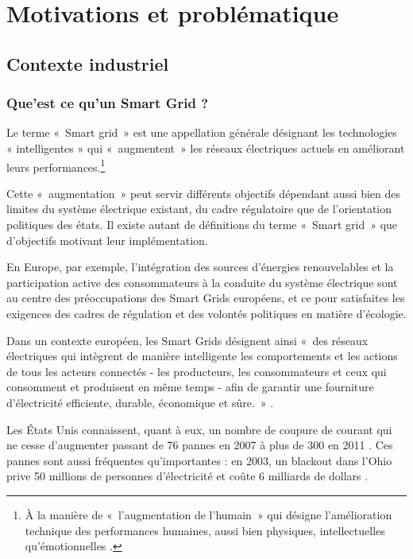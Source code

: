 \chapter{Motivations et problématique}
\label{chap:problematique}

\section{Contexte industriel}

\subsection{Que'est ce qu'un Smart Grid ?}
Le terme «~Smart grid~» est une appellation générale désignant les technologies « intelligentes » qui «~augmentent~» les réseaux électriques actuels en améliorant leurs performances.\footnote{À la manière de «~l'augmentation de l'humain~» qui désigne l'amélioration technique des performances humaines, aussi bien physiques, intellectuelles qu'émotionnelles \cite{le2013humain}.}

Cette «~augmentation~» peut servir différents objectifs dépendant aussi bien des limites du système électrique existant, du cadre régulatoire que de l'orientation politiques des états. Il existe autant de définitions du terme «~Smart grid~» que d'objectifs motivant leur implémentation.

En Europe, par exemple, l'intégration des sources d'énergies renouvelables et la participation active des consommateurs à la conduite du système électrique sont au centre des préoccupations des Smart Grids européens, et ce pour satisfaites les exigences des cadres de régulation et des volontés politiques en matière d'écologie.

Dans un contexte européen, les Smart Grids désignent ainsi «~des réseaux électriques qui intègrent de manière intelligente les comportements et les actions de tous les acteurs connectés - les producteurs, les consommateurs et ceux qui consomment et produisent en même temps - afin de garantir une fourniture d'électricité efficiente, durable, économique et sûre.~» \cite{ETP}.

Les États Unis connaissent, quant à eux, un nombre de coupure de courant qui ne cesse d'augmenter passant de 76 pannes en 2007 à plus de 300 en 2011 \cite{detroit}. Ces pannes sont aussi fréquentes qu'importantes : en 2003, un blackout dans l'Ohio prive 50 millions de personnes d'électricité et coûte 6 milliards de dollars \cite{andersson2005causes}.

